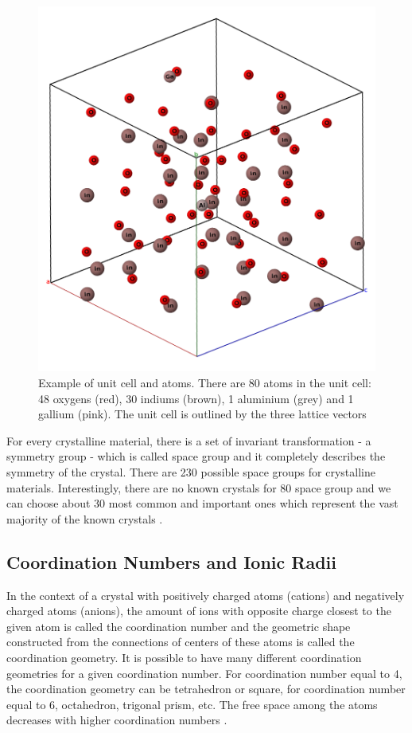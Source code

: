 \documentclass[11pt,oneside,czech,american]{book} %
\theoremstyle{definition} %
\theoremstyle{definition}
\begin{document}
\begin{figure}[H]
	\centering
	\includegraphics[scale=0.35]{string_label_crop.png}
	\caption{Example of unit cell and atoms. There are 80 atoms in the unit cell: 48 oxygens (red), 30 indiums (brown), 1 aluminium (grey) and 1 gallium (pink). The unit cell is outlined by the three lattice vectors \parencite{jmol}}
	\label{alloy}
\end{figure}
For every crystalline material, there is a set of invariant transformation - a symmetry group - which is called space group and it completely describes the symmetry of the crystal. There are 230 possible space groups for crystalline materials. Interestingly, there are no known crystals for 80 space group and we can choose about 30 most common and important ones which represent the vast majority of the known crystals \parencite{kraus16}.
\subsection{Coordination Numbers and Ionic Radii} \label{numbers_radii}
In the context of a crystal with positively charged atoms (cations) and negatively charged atoms (anions), the amount of ions with opposite charge closest to the given atom is called the coordination number and the geometric shape constructed from the connections of centers of these atoms is called the coordination geometry. It is possible to have many different coordination geometries for a given coordination number. For coordination number equal to 4, the coordination geometry can be tetrahedron or square, for coordination number equal to 6, octahedron, trigonal prism, etc. The free space among the atoms decreases with higher coordination numbers \parencite{kraus16}.
\end{document}
